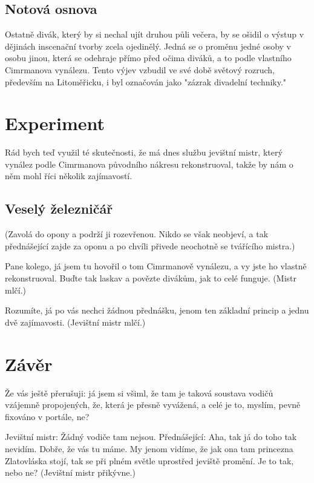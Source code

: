 \documentclass[11pt]{article}
\begin{document}
\subsection{Notová osnova}
Ostatně divák, který by si nechal ujít druhou půli večera, by se ošidil o výstup v dějinách inscenační tvorby zcela ojedinělý. Jedná se o proměnu jedné osoby v osobu jinou, která se odehraje přímo před očima diváků, a to podle vlastního Cimrmanova vynálezu. Tento výjev vzbudil ve své době světový rozruch, především na Litoměřicku, i byl označován jako "zázrak divadelní techniky."


\section{Experiment}
Rád bych teď využil té skutečnosti, že má dnes službu jevištní mistr, který vynález podle Cimrmanova původního nákresu rekonstruoval, takže by nám o něm mohl říci několik zajímavostí. 

\subsection{Veselý železničář}
(Zavolá do opony a podrží ji rozevřenou. Nikdo se však neobjeví, a tak přednášející zajde za oponu a po chvíli přivede neochotně se tvářícího mistra.)

Pane kolego, já jsem tu hovořil o tom Cimrmanově vynálezu, a vy jste ho vlastně rekonstruoval. Buďte tak laskav a povězte divákům, jak to celé funguje. (Mistr mlčí.)

Rozumíte, já po vás nechci žádnou přednášku, jenom ten základní princip a jednu dvě zajímavosti. (Jevištní mistr mlčí.)
\section{Závěr}
Že vás ještě přerušuji: já jsem si všiml, že tam je taková soustava vodičů vzájemně propojených, že, která je přesně vyvážená, a celé je to, myslím, pevně fixováno v portále, ne?

Jevištní mistr: Žádný vodiče tam nejsou. Přednášející: Aha, tak já do toho tak nevidím. Dobře, že vás tu máme. My jenom vidíme, že jak ona tam princezna Zlatovláska stojí, tak se při plném světle uprostřed jeviště promění. Je to tak, nebo ne? (Jevištní mistr přikývne.)
\end{document}
